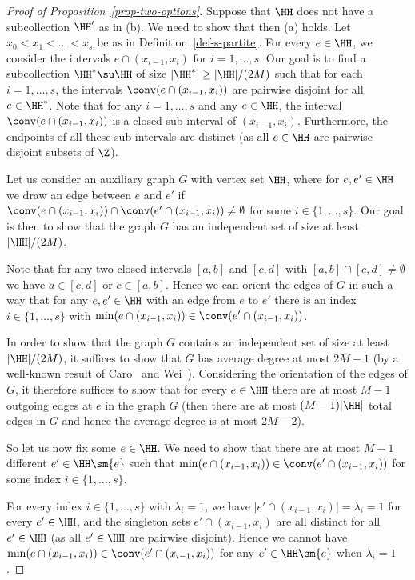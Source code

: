 \begin{proof}[Proof of Proposition~\ref{prop-two-options}]
Suppose that $\HH$ does not have a subcollection $\HH'$ as in (b). We need to show that then (a) holds. Let $x_0<x_1<\dots<x_s$ be as in Definition~\ref{def-s-partite}. For every $e\in \HH$, we consider the intervals $e\cap (x_{i-1},x_i)$ for $i=1,\dots,s$. Our goal is to find a subcollection $\HH^*\su \HH$ of size $|\HH^*|\ge |\HH|/(2M)$ such that for each $i=1,\dots,s$, the intervals $\conv(e\cap (x_{i-1},x_i))$ are pairwise disjoint for all $e\in \HH^*$. Note that for any $i=1,\dots,s$ and any $e\in \HH$, the interval $\conv(e\cap (x_{i-1},x_i))$ is a closed sub-interval of $(x_{i-1},x_i)$. Furthermore, the endpoints of all these sub-intervals are distinct (as all $e\in \HH$ are pairwise disjoint subsets of $\Z$).

Let us consider an auxiliary graph $G$ with vertex set $\HH$, where for $e,e'\in\HH$ we draw an edge between $e$ and $e'$ if $\conv(e\cap (x_{i-1},x_i))\cap \conv(e'\cap (x_{i-1},x_i))\ne \emptyset$ for some $i\in\{1,\dots,s\}$. Our goal is then to show that the graph $G$ has an independent set of size at least $|\HH|/(2M)$.

Note that for any two closed intervals $[a,b]$ and $[c,d]$ with $[a,b]\cap [c,d]\ne \emptyset$ we have $a\in [c,d]$ or $c\in [a,b]$. Hence we can orient the edges of $G$ in such a way that for any $e,e'\in\HH$ with an edge from $e$ to $e'$ there is an index $i\in\{1,\dots,s\}$ with $\min(e\cap (x_{i-1},x_i))\in \conv(e'\cap (x_{i-1},x_i))$.

In order to show that the graph $G$ contains an independent set of size at least $|\HH|/(2M)$, it suffices to show that $G$ has average degree at most $2M-1$ (by a well-known result of Caro~\cite{Caro} and Wei~\cite{Wei}). Considering the orientation of the edges of $G$, it therefore suffices to show that for every $e\in \HH$ there are at most $M-1$ outgoing edges at $e$ in the graph $G$ (then there are at most $(M-1)|\HH|$ total edges in $G$ and hence the average degree is at most $2M-2$).

So let us now fix some $e\in \HH$. We need to show that there are at most $M-1$ different $e'\in\HH\sm\{e\}$ such that $\min(e\cap (x_{i-1},x_i))\in \conv(e'\cap (x_{i-1},x_i))$ for some index $i\in\{1,\dots,s\}$. 

For every index $i\in\{1,\dots,s\}$ with $\lambda_i=1$, we have $|e'\cap (x_{i-1},x_i)|=\lambda_i=1$ for every $e'\in \HH$, and the singleton sets $e'\cap (x_{i-1},x_i)$ are all distinct for all $e'\in \HH$ (as all $e'\in \HH$ are pairwise disjoint). Hence we cannot have $\min(e\cap (x_{i-1},x_i))\in \conv(e'\cap (x_{i-1},x_i))$ for any $e'\in \HH\sm\{e\}$ when $\lambda_i=1$.


\end{proof}
